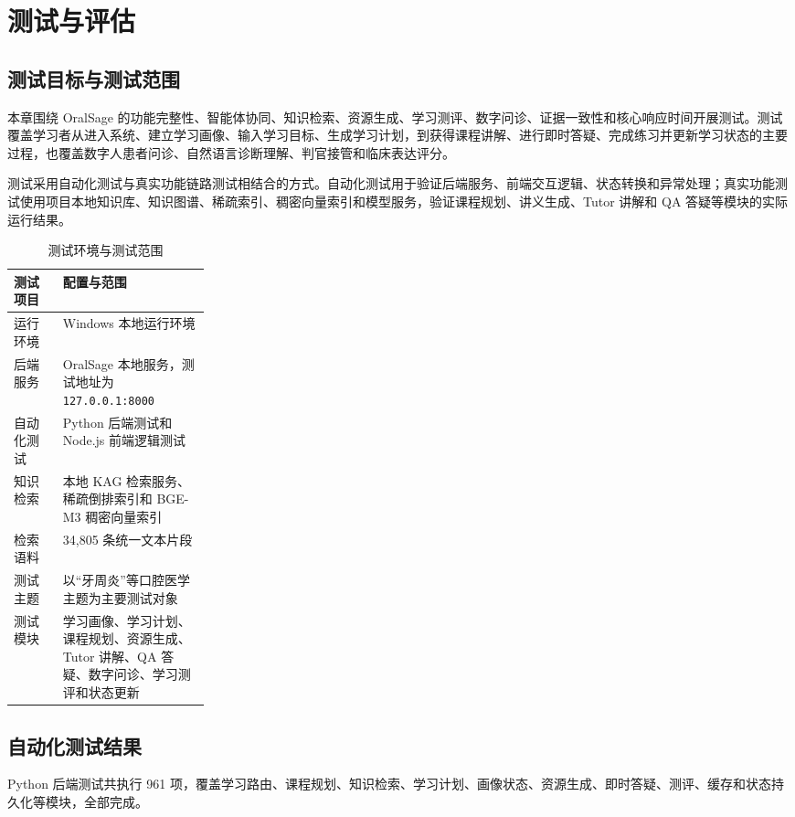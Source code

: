 \chapter{测试与评估}
\label{sec:testing}

\section{测试目标与测试范围}

本章围绕 OralSage 的功能完整性、智能体协同、知识检索、资源生成、学习测评、数字问诊、证据一致性和核心响应时间开展测试。测试覆盖学习者从进入系统、建立学习画像、输入学习目标、生成学习计划，到获得课程讲解、进行即时答疑、完成练习并更新学习状态的主要过程，也覆盖数字人患者问诊、自然语言诊断理解、判官接管和临床表达评分。

测试采用自动化测试与真实功能链路测试相结合的方式。自动化测试用于验证后端服务、前端交互逻辑、状态转换和异常处理；真实功能测试使用项目本地知识库、知识图谱、稀疏索引、稠密向量索引和模型服务，验证课程规划、讲义生成、Tutor 讲解和 QA 答疑等模块的实际运行结果。

\begin{table}[H]
  \centering
  \caption{测试环境与测试范围}
  \label{tab:test-environment}
  \begin{tabularx}{\linewidth}{p{0.25\linewidth}X}
    \toprule
    测试项目 & 配置与范围 \\
    \midrule
    运行环境 & Windows 本地运行环境 \\
    后端服务 & OralSage 本地服务，测试地址为 \texttt{127.0.0.1:8000} \\
    自动化测试 & Python 后端测试和 Node.js 前端逻辑测试 \\
    知识检索 & 本地 KAG 检索服务、稀疏倒排索引和 BGE-M3 稠密向量索引 \\
    检索语料 & 34,805 条统一文本片段 \\
    测试主题 & 以“牙周炎”等口腔医学主题为主要测试对象 \\
    测试模块 & 学习画像、学习计划、课程规划、资源生成、Tutor 讲解、QA 答疑、数字问诊、学习测评和状态更新 \\
    \bottomrule
  \end{tabularx}
\end{table}

\section{自动化测试结果}

Python 后端测试共执行 961 项，覆盖学习路由、课程规划、知识检索、学习计划、画像状态、资源生成、即时答疑、测评、缓存和状态持久化等模块，全部完成。

